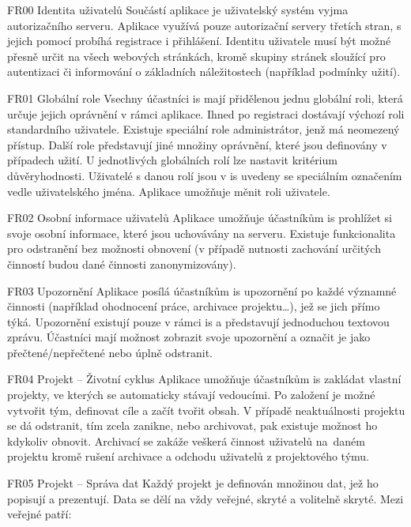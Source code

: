 \begin{dl}
   \item[FR00 Identita uživatelů]
   Součástí aplikace je uživatelský systém vyjma autorizačního serveru. Aplikace využívá pouze autorizační servery třetích stran, s jejich pomocí probíhá registrace i přihlášení. Identitu uživatele musí být možné přesně určit na všech webových stránkách, kromě skupiny stránek sloužící pro autentizaci či informování o základních náležitostech (například podmínky užití).

   \item[FR01 Globální role]
   Vsechny účastníci \gls{is} mají přidělenou jednu globální roli, která určuje jejich oprávnění v rámci aplikace. Ihned po registraci dostávají výchozí roli standardního uživatele. Existuje speciální role administrátor, jenž má neomezený přístup. Další role představují jiné množiny oprávnění, které jsou definovány v případech užití. U jednotlivých globálních rolí lze nastavit kritérium důvěryhodnosti. Uživatelé s danou rolí jsou v \gls{is} uvedeny se speciálním označením vedle uživatelského jména. Aplikace umožňuje měnit roli uživatele.

   \item[FR02 Osobní informace uživatelů]
   Aplikace umožňuje účastníkům \gls{is} prohlížet si svoje osobní informace, které jsou uchovávány na serveru. Existuje funkcionalita pro odstranění bez možnosti obnovení (v případě nutnosti zachování určitých činností budou dané činnosti zanonymizovány).

   \item[FR03 Upozornění]
   Aplikace posílá účastníkům \gls{is} upozornění po každé významné činnosti (například ohodnocení práce, archivace projektu\dots{}), jež se jich přímo týká. Upozornění existují pouze v rámci \gls{is} a představují jednoduchou textovou zprávu. Účastníci mají možnost zobrazit svoje upozornění a označit je jako přečtené/nepřečtené nebo úplně odstranit.

   \item[FR04 Projekt -- Životní cyklus]
   Aplikace umožňuje účastníkům \gls{is} zakládat vlastní projekty, ve kterých se automaticky stávají vedoucími. Po založení je možné vytvořit tým, definovat cíle a začít tvořit obsah. V případě neaktuálnosti projektu se dá odstranit, tím zcela zanikne, nebo archivovat, pak existuje možnost ho kdykoliv obnovit. Archivací se zakáže veškerá činnost uživatelů na~daném projektu kromě rušení archivace a odchodu uživatelů z projektového týmu.

   \item[FR05 Projekt -- Správa dat]
   Každý projekt je definován množinou dat, jež ho popisují a prezentují. Data se dělí na vždy veřejné, skryté a volitelně skryté. Mezi veřejné patří: 


\end{dl}
